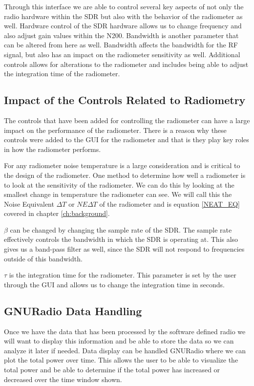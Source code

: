 Through this interface we are able to control several key aspects of not only the radio hardware within the SDR but also with the behavior of the radiometer as well.  Hardware control of the SDR hardware allows us to change frequency and also adjust gain values within the N200.  Bandwidth is another parameter that can be altered from here as well.  Bandwidth affects the bandwidth for the RF signal, but also has an impact on the radiometer sensitivity as well.  Additional controls allows for alterations to the radiometer and includes being able to adjust the integration time of the radiometer.  

\subsection{Impact of the Controls Related to Radiometry}

The controls that have been added for controlling the radiometer can have a large impact on the performance of the radiometer.  There is a reason why these controls were added to the GUI for the radiometer and that is they play key roles in how the radiometer performs.  

For any radiometer noise temperature is a large consideration and is critical to the design of the radiometer.  One method to determine how well a radiometer is to look at the sensitivity of the radiometer.  We can do this by looking at the smallest change in temperature the radiometer can see.  We will call this the Noise Equivalent $\Delta T$ or $NE\Delta T$ of the radiometer and is equation \ref{NEAT_EQ} covered in chapter \ref{ch:background}.

$\beta$ can be changed by changing the sample rate of the SDR.  The sample rate effectively controls the bandwidth in which the SDR is operating at.  This also gives us a band-pass filter as well, since the SDR will not respond to frequencies outside of this bandwidth.  

$\tau$ is the integration time for the radiometer.  This parameter is set by the user through the GUI and allows us to change the integration time in seconds.

\subsection{GNURadio Data Handling}
Once we have the data that has been processed by the software defined radio we will want to display this information and be able to store the data so we can analyze it later if needed.  Data display can be handled GNURadio where we can plot the total power over time.  This allows the user to be able to visualize the total power and be able to determine if the total power has increased or decreased over the time window shown.  

